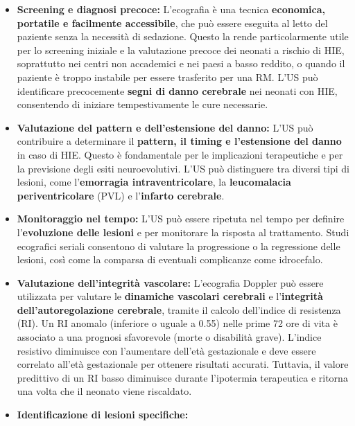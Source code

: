 \begin{itemize}
	\item
	\textbf{Screening e diagnosi precoce:} L'ecografia è una tecnica \textbf{economica, portatile e facilmente accessibile}, che può essere eseguita al letto del paziente senza la necessità di sedazione. Questo la rende particolarmente utile per lo screening iniziale e la valutazione precoce dei neonati a rischio di HIE, soprattutto nei centri non accademici e nei paesi a basso reddito, o quando il paziente è troppo instabile per essere trasferito per una RM. L'US può identificare precocemente \textbf{segni di danno cerebrale} nei neonati con HIE, consentendo di iniziare tempestivamente le cure necessarie.
	\item
	\textbf{Valutazione del pattern e dell'estensione del danno:} L'US può contribuire a determinare il \textbf{pattern, il timing e l'estensione del danno} in caso di HIE. Questo è fondamentale per le implicazioni terapeutiche e per la previsione degli esiti neuroevolutivi. L'US può distinguere tra diversi tipi di lesioni, come l'\textbf{emorragia intraventricolare}, la \textbf{leucomalacia periventricolare} (PVL) e l'\textbf{infarto cerebrale}.
	\item
	\textbf{Monitoraggio nel tempo:} L'US può essere ripetuta nel tempo per definire l'\textbf{evoluzione delle lesioni} e per monitorare la risposta al trattamento. Studi ecografici seriali consentono di valutare la progressione o la regressione delle lesioni, così come la comparsa di eventuali complicanze come idrocefalo.
	\item
	\textbf{Valutazione dell'integrità vascolare:} L'ecografia Doppler può essere utilizzata per valutare le \textbf{dinamiche vascolari cerebrali} e l'\textbf{integrità dell'autoregolazione cerebrale}, tramite il calcolo dell'indice di resistenza (RI). Un RI anomalo (inferiore o uguale a 0.55) nelle prime 72 ore di vita è associato a una prognosi sfavorevole (morte o disabilità grave). L'indice resistivo diminuisce con l'aumentare dell'età gestazionale e deve essere correlato all'età gestazionale per ottenere risultati accurati. Tuttavia, il valore predittivo di un RI basso diminuisce durante l'ipotermia terapeutica e ritorna una volta che il neonato viene riscaldato.
	\item
	\textbf{Identificazione di lesioni specifiche:}
	

\end{itemize}
